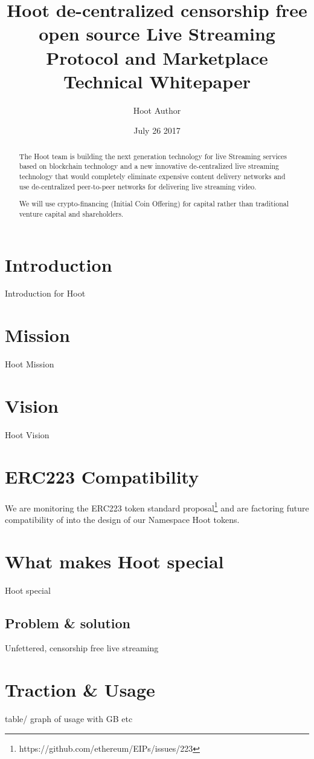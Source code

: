 \documentclass{article}
\title{Hoot de-centralized censorship free open source Live Streaming Protocol and Marketplace Technical Whitepaper}
\author{Hoot Author}
\date{July 26 2017}
\begin{document}
\maketitle

\begin{abstract}
The Hoot team is building the next generation technology for live
Streaming services  based on blockchain technology and a new
innovative de-centralized live streaming technology that would
completely eliminate expensive content delivery networks and use de-centralized peer-to-peer networks for delivering live streaming video.

We will use crypto-financing (Initial Coin Offering) for capital rather than traditional venture capital and shareholders.
\end{abstract}
\newpage

\tableofcontents
\newpage

\section{Introduction}
Introduction for Hoot


\section{Mission}
Hoot Mission

\section{Vision}
Hoot Vision

\section{ERC223 Compatibility}
We are monitoring the ERC223 token standard proposal\footnote{https://github.com/ethereum/EIPs/issues/223} and are factoring future compatibility of into the design of our Namespace Hoot tokens.

\section{What makes Hoot special}
Hoot special

\subsection{Problem \& solution}
Unfettered, censorship free live streaming

\section{Traction \& Usage}
table/ graph of usage with GB etc
\end{document}
